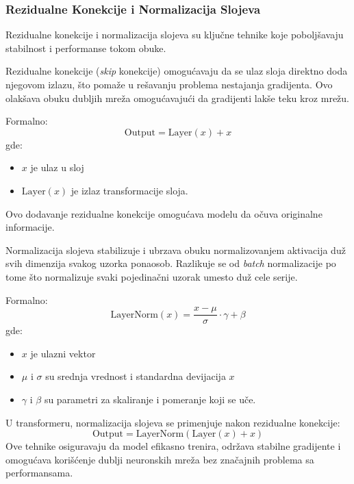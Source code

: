 \documentclass[12pt]{article}
\begin{document}
   \subsubsection*{Rezidualne Konekcije i Normalizacija Slojeva}

   Rezidualne konekcije i normalizacija slojeva su ključne tehnike koje poboljšavaju 
   stabilnost i performanse tokom obuke.

   Rezidualne konekcije (\textit{skip} konekcije) omogućavaju da se ulaz sloja direktno 
   doda njegovom izlazu, što pomaže u rešavanju problema nestajanja gradijenta. Ovo 
   olakšava obuku dubljih mreža omogućavajući da gradijenti lakše teku kroz mrežu.

   Formalno:
   \[
   \text{Output} = \text{Layer}(x) + x
   \]
   gde:
   \begin{itemize}
      \vspace{-0.5cm}
      \item \( x \) je ulaz u sloj
      \item \( \text{Layer}(x) \) je izlaz transformacije sloja.
   \end{itemize}

   Ovo dodavanje rezidualne konekcije omogućava modelu da očuva originalne informacije.
   
   Normalizacija slojeva stabilizuje i ubrzava obuku normalizovanjem aktivacija duž 
   svih dimenzija svakog uzorka ponaosob. Razlikuje se od \textit{batch} normalizacije po 
   tome što normalizuje svaki pojedinačni uzorak umesto duž cele serije.

   Formalno:
   \[
   \text{LayerNorm}(x) = \frac{x - \mu}{\sigma} \cdot \gamma + \beta
   \]
   gde:
   \begin{itemize}
      \vspace{-0.5cm}
      \setlength\itemsep{0.2em} %
      \item \( x \) je ulazni vektor
      \item \( \mu \) i \( \sigma \) su srednja vrednost i standardna devijacija \( x \)
      \item \( \gamma \) i \( \beta \) su parametri za skaliranje i pomeranje koji se uče.
   \end{itemize}

   U transformeru, normalizacija slojeva se primenjuje nakon rezidualne konekcije:
   \[
   \text{Output} = \text{LayerNorm}(\text{Layer}(x) + x)
   \]  
   Ove tehnike osiguravaju da model efikasno trenira, održava stabilne gradijente i 
   omogućava korišćenje dublji neuronskih mreža bez značajnih problema sa performansama.
\end{document}
